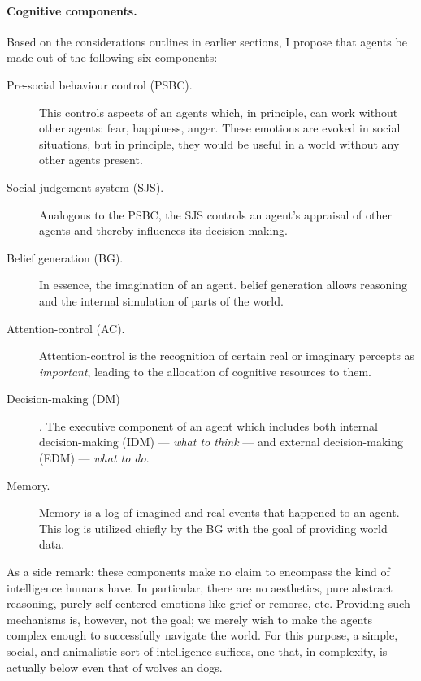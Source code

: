 \paragraph{Cognitive components.} Based on the considerations outlines in earlier sections, I propose that agents be made out of the following six components:

\begin{description}
	\item[Pre-social behaviour control (PSBC).] This controls aspects of an agents which, in principle, can work without other agents: fear, happiness, anger.  These emotions are evoked in social situations, but in principle, they would be useful in a world without any other agents present.
	\item[Social judgement system (SJS).] Analogous to the \textsc{PSBC}, the \textsc{SJS} controls an agent's appraisal of other agents and thereby influences its decision-making.
	\item[Belief generation (BG).] In essence, the imagination of an agent. belief generation allows reasoning and the internal simulation of parts of the world.
	\item[Attention-control (AC).] Attention-control is the recognition of certain real or imaginary percepts as {\em important}, leading to the allocation of cognitive resources to them.
	\item[Decision-making (DM)]. The executive component of an agent which includes both internal decision-making (IDM) --- {\em what to think} --- and external decision-making (EDM) --- {\em what to do}.
	\item[Memory.] Memory is a log of imagined and real events that happened to an agent. This log is utilized chiefly by the \textsc{BG} with the goal of providing world data.
\end{description}

As a side remark: these components make no claim to encompass the kind of intelligence humans have. In particular, there are no aesthetics, pure abstract reasoning,  purely self-centered emotions like grief or remorse, etc. Providing such mechanisms is, however, not the goal; we merely wish to make the agents complex enough to successfully navigate the world. For this purpose, a simple, social, and animalistic sort of intelligence suffices, one that, in complexity, is actually below even that of wolves an dogs.

